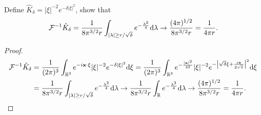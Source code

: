 \begin{pro}
  Define $\hat{K}_{\delta} = |\xi|^{-2}e^{-\delta|\xi|^2}$,
  show that
  \begin{displaymath}
    \mathcal{F}^{-1}\hat{K}_{\delta} = \frac{1}{8\pi^{3/2}r}
    \int_{|\lambda|\ge r/\sqrt{\delta}}e^{-\frac{\lambda^2}{4}}\mathrm{d}\lambda
    \to \frac{(4\pi)^{1/2}}{8\pi^{3/2}r} = \frac{1}{4\pi r}.
  \end{displaymath}
\end{pro}

\begin{proof}
  \begin{align*}
    \mathcal{F}^{-1}\hat{K}_{\delta} &= \frac{1}{(2\pi)^3}\int_{\mathbb{R}^3}e^{-i\mathbf{x}\cdot\xi}|\xi|^{-2}e^{-\delta|\xi|^2}\mathrm{d}\xi
                                     = \frac{1}{(2\pi)^3}\int_{\mathbb{R}^3}e^{-\frac{|\mathbf{x}|^2}{4\delta}}|\xi|^{-2}e^{-\left|\sqrt{\delta}\xi+\frac{i\mathbf{x}}{2\sqrt{\delta}}\right|^2}\mathrm{d}\xi \\
    &= \frac{1}{8\pi^{3/2}r}
    \int_{|\lambda|\ge r/\sqrt{\delta}}e^{-\frac{\lambda^2}{4}}\mathrm{d}\lambda
    \to \frac{1}{8\pi^{3/2}r}
    \int_{\mathbb{R}}e^{-\frac{\lambda^2}{4}}\mathrm{d}\lambda\to \frac{(4\pi)^{1/2}}{8\pi^{3/2}r} = \frac{1}{4\pi r}.
  \end{align*}
\end{proof}
